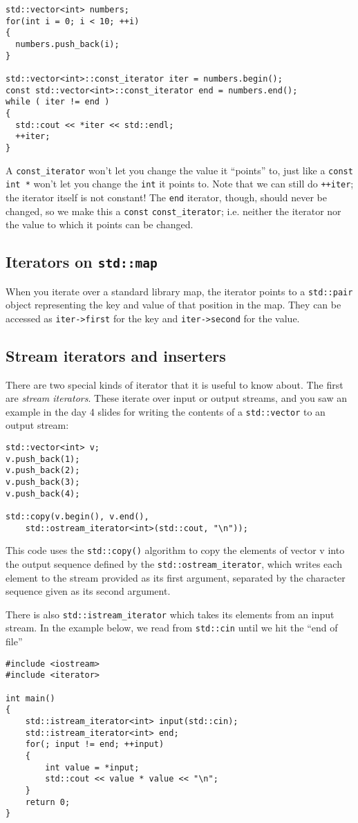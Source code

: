 \documentclass[a4paper]{scrartcl}
\begin{document}
\begin{verbatim}
std::vector<int> numbers;
for(int i = 0; i < 10; ++i)
{
  numbers.push_back(i);
}

std::vector<int>::const_iterator iter = numbers.begin();
const std::vector<int>::const_iterator end = numbers.end();
while ( iter != end )
{
  std::cout << *iter << std::endl;
  ++iter;
}
\end{verbatim}

A \verb|const_iterator| won't let you change the value it ``points'' to, just like a \verb|const int *| won't let you change the \verb|int| it points to. Note that we can still do \verb|++iter|; the iterator itself is not constant! The \verb|end| iterator, though, should never be changed, so we make this a \verb|const| \verb|const_iterator|; i.e. neither the iterator nor the value to which it points can be changed.

\subsection{Iterators on \texttt{std::map}}
When you iterate over a standard library map, the iterator points to a \verb|std::pair| object representing the key and value of that position in the map. They can be accessed as \verb|iter->first| for the key and \verb|iter->second| for the value.

\subsection{Stream iterators and inserters}
There are two special kinds of iterator that it is useful to know about. The first are \emph{stream iterators}. These iterate over input or output streams, and you saw an example in the day 4 slides for writing the contents of a \verb|std::vector| to an output stream:
\begin{verbatim}
std::vector<int> v;
v.push_back(1);
v.push_back(2);
v.push_back(3);
v.push_back(4);

std::copy(v.begin(), v.end(),
    std::ostream_iterator<int>(std::cout, "\n"));
\end{verbatim}

This code uses the \verb|std::copy()| algorithm to copy the elements of vector v into the output sequence defined by the \verb|std::ostream_iterator|, which writes each element to the stream provided as its first argument, separated by the character sequence given as its second argument.

There is also \verb|std::istream_iterator| which takes its elements from an input stream. In the example below, we read from \verb|std::cin| until we hit the ``end of file''
\begin{verbatim}
#include <iostream>
#include <iterator>

int main()
{
    std::istream_iterator<int> input(std::cin);
    std::istream_iterator<int> end;
    for(; input != end; ++input)
    {
        int value = *input;
        std::cout << value * value << "\n";
    }
    return 0;
}
\end{verbatim}
\end{document}
